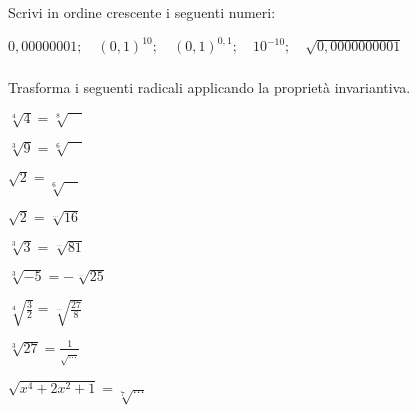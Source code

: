 \begin{esercizio}
\label{ese:2.20}
Scrivi in ordine crescente i seguenti numeri:

\(0,00000001;\quad (0,1)^{10};\quad (0,1)^{0,1};\quad 10^{-10};
\quad \sqrt{0,0000000001}\)
\end{esercizio}


\subsubsection*{}

\begin{esercizio}
\label{ese:2.21}
Trasforma i seguenti radicali applicando la proprietà invariantiva.
\vspace{-.5em}
\begin{htmulticols}{3}
\begin{enumeratea}
\item \(\sqrt[4]4=\sqrt[8]{\phantom{16}}\)
\item \(\sqrt[3]9=\sqrt[6]{\phantom{82}}\)
\item \(\sqrt 2=\sqrt[6]{\quad}\)
\item \(\sqrt 2=\sqrt[\dots]{16}\)
\item \(\sqrt[3]3=\sqrt[\dots]{81}\)
\item \(\sqrt[3]{-5}=-\sqrt[\ldots]{25}\)
\item \(\sqrt[4]{\frac 3 2}=\sqrt[\ldots]{\frac{27} 8}\)
\item \(\sqrt[3]{27}=\frac 1{\sqrt{\ldots}}\)
\item \(\sqrt{x^4+2x^2+1}=\sqrt[7]{\ldots}\)
\end{enumeratea}
\end{htmulticols}
\end{esercizio}

